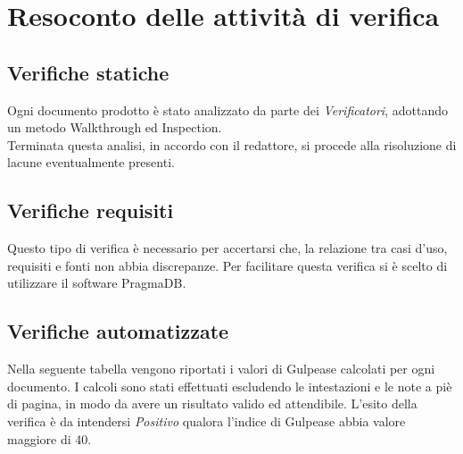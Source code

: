 \section{Resoconto delle attività di verifica}

	\subsection{Verifiche statiche}
		Ogni documento prodotto è stato analizzato da parte dei \textit{Verificatori}, adottando un metodo Walkthrough ed Inspection.\\
		Terminata questa analisi, in accordo con il redattore, si procede alla risoluzione di lacune eventualmente presenti.
	
	\subsection{Verifiche requisiti}
		Questo tipo di verifica è necessario per accertarsi che, la relazione tra casi d'uso, requisiti e fonti non abbia discrepanze. Per facilitare questa verifica si è scelto di utilizzare il software PragmaDB.
	
	\subsection{Verifiche automatizzate}
		Nella seguente tabella vengono riportati i valori di Gulpease calcolati per ogni documento.
		I calcoli sono stati effettuati escludendo le intestazioni e le note a piè di pagina, in modo da avere un risultato valido ed attendibile. L'esito della verifica è da intendersi \textit{Positivo} qualora l'indice di Gulpease abbia valore maggiore di 40.
		
